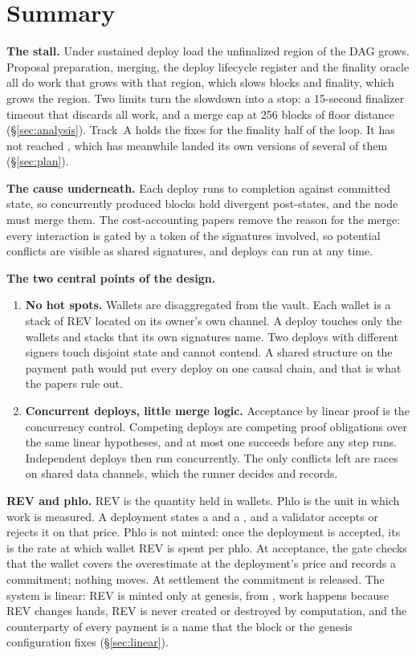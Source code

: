 \documentclass[11pt]{article}
\newcommand{\code}{\path}
\begin{document}
\tableofcontents
\newpage

\section{Summary}

\textbf{The stall.} Under sustained deploy load the unfinalized region of the DAG grows. Proposal preparation, merging, the deploy lifecycle register and the finality oracle all do work that grows with that region, which slows blocks and finality, which grows the region. Two limits turn the slowdown into a stop: a 15-second finalizer timeout that discards all work, and a merge cap at 256 blocks of floor distance (\S\ref{sec:analysis}). Track~A holds the fixes for the finality half of the loop. It has not reached \code{dev}, which has meanwhile landed its own versions of several of them (\S\ref{sec:plan}).

\textbf{The cause underneath.} Each deploy runs to completion against committed state, so concurrently produced blocks hold divergent post-states, and the node must merge them. The cost-accounting papers remove the reason for the merge: every interaction is gated by a token of the signatures involved, so potential conflicts are visible as shared signatures, and deploys can run at any time.

\textbf{The two central points of the design.}
\begin{enumerate}
\item \textbf{No hot spots.} Wallets are disaggregated from the vault. Each wallet is a stack of REV located on its owner's own channel. A deploy touches only the wallets and stacks that its own signatures name. Two deploys with different signers touch disjoint state and cannot contend. A shared structure on the payment path would put every deploy on one causal chain, and that is what the papers rule out.
\item \textbf{Concurrent deploys, little merge logic.} Acceptance by linear proof is the concurrency control. Competing deploys are competing proof obligations over the same linear hypotheses, and at most one succeeds before any step runs. Independent deploys then run concurrently. The only conflicts left are races on shared data channels, which the runner decides and records.
\end{enumerate}

\textbf{REV and phlo.} REV is the quantity held in wallets. Phlo is the unit in which work is measured. A deployment states a \code{phloLimit} and a \code{phloPrice}, and a validator accepts or rejects it on that price. Phlo is not minted: once the deployment is accepted, its \code{phloPrice} is the rate at which wallet REV is spent per phlo. At acceptance, the gate checks that the wallet covers the overestimate at the deployment's price and records a commitment; nothing moves. At settlement the commitment is released. The system is linear: REV is minted only at genesis, from \code{wallets.txt}, work happens because REV changes hands, REV is never created or destroyed by computation, and the counterparty of every payment is a name that the block or the genesis configuration fixes (\S\ref{sec:linear}).
\end{document}
